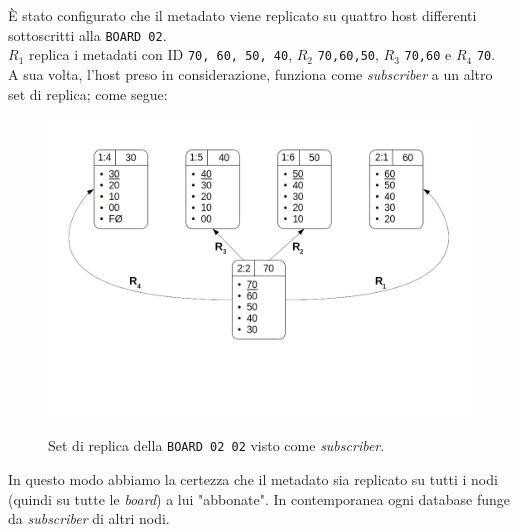 \`{E} stato configurato che il metadato viene replicato su quattro host differenti sottoscritti alla \verb"BOARD 02".\\
$R_1$ replica i metadati con ID \verb"70, 60, 50, 40", $R_2$ \verb"70,60,50", $R_3$ \verb"70,60" e $R_4$ \verb"70".\\

A sua volta, l'host preso in considerazione, funziona come \textit{subscriber} a un altro set di replica; come segue:

\begin{figure}[htbp]
\centering
\includegraphics[scale=0.40]{img/sub_replica.png}\\
\caption{Set di replica della \verb"BOARD 02 02" visto come \textit{subscriber}. \label{figura1.18}}
\end{figure}

In questo modo abbiamo la certezza che il metadato sia replicato su tutti i nodi (quindi su tutte le \textit{board}) a lui "abbonate". In contemporanea ogni database funge da \textit{subscriber} di altri nodi.

